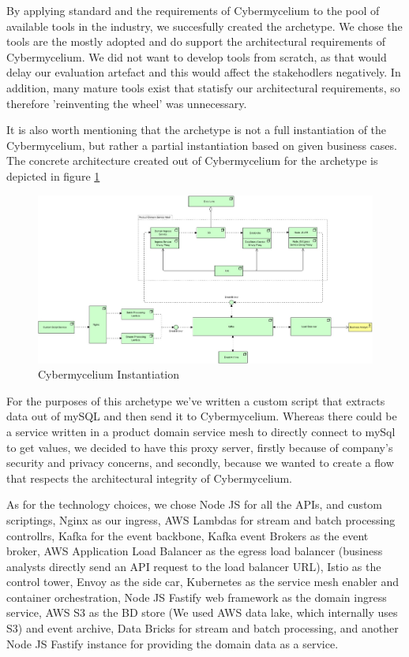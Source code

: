 \documentclass[review]{elsarticle}
\begin{document}
By applying standard and the requirements of Cybermycelium to the pool of available tools in the industry, we succesfully created the archetype. We chose the tools are the mostly adopted and do support the architectural requirements of Cybermycelium. We did not want to develop tools from scratch, as that would delay our evaluation artefact and this would affect the stakehodlers negatively. In addition, many mature tools exist that statisfy our architectural requirements, so therefore 'reinventing the wheel' was unnecessary.

It is also worth mentioning that the archetype is not a full instantiation of the Cybermycelium, but rather a partial instantiation based on given business cases. The concrete architecture created out of Cybermycelium for the archetype is depicted in figure \ref{fig:ConcreteCyberMycelium}

\begin{figure}[h!]
    \centering
    \includegraphics[width=12cm]{Media/concrete-mycelium.jpg}
    \caption{Cybermycelium Instantiation}
    \label{fig:ConcreteCyberMycelium}
\end{figure}

For the purposes of this archetype we've written a custom script that extracts data out of mySQL and then send it to Cybermycelium. Whereas there could be a service written in a product domain service mesh to directly connect to mySql to get values, we decided to have this proxy server, firstly because of company's security and privacy concerns, and secondly, because we wanted to create a flow that respects the architectural integrity of Cybermycelium.

As for the technology choices, we chose Node JS for all the APIs, and custom scriptings, Nginx as our ingress, AWS Lambdas for stream and batch processing controllrs, Kafka for the event backbone, Kafka event Brokers as the event broker, AWS Application Load Balancer as the egress load balancer (business analysts directly send an API request to the load balancer URL), Istio as the control tower, Envoy as the side car, Kubernetes as the service mesh enabler and container orchestration, Node JS Fastify web framework as the domain ingress service, AWS S3 as the BD store (We used AWS data lake, which internally uses S3) and event archive, Data Bricks for stream and batch processing, and another Node JS Fastify instance for providing the domain data as a service.
\end{document}
